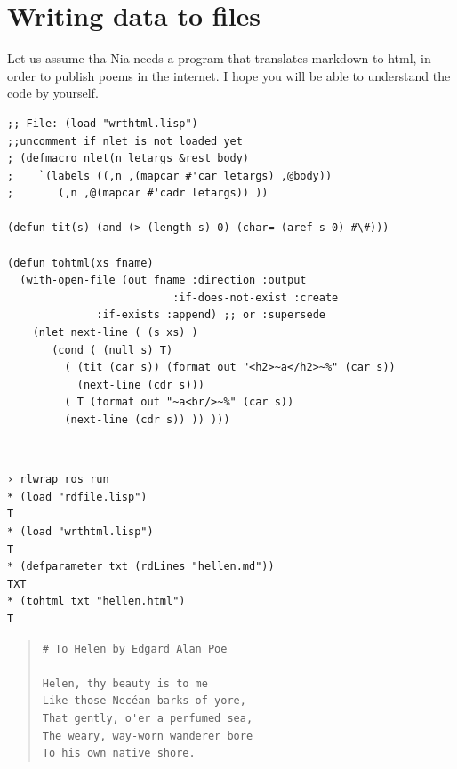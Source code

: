 \documentclass[a4paper,12pt]{book}
\newenvironment{fmpage}[1]
           {\begin{lrbox}{\fmbox}\begin{minipage}{#1}}
           {\end{minipage}\end{lrbox}\fbox{\usebox{\fmbox}}}
\begin{document}
\section{Writing data to files}
Let us assume tha Nia needs a program that translates
markdown to html, in order to publish poems in the internet.
I hope you will be able to understand the code by yourself.\\
\begin{fmpage}{\linewidth}
\begin{verbatim}
;; File: (load "wrthtml.lisp")
;;uncomment if nlet is not loaded yet
; (defmacro nlet(n letargs &rest body)
;    `(labels ((,n ,(mapcar #'car letargs) ,@body))
;       (,n ,@(mapcar #'cadr letargs)) ))

(defun tit(s) (and (> (length s) 0) (char= (aref s 0) #\#)))

(defun tohtml(xs fname)
  (with-open-file (out fname :direction :output
                          :if-does-not-exist :create
			  :if-exists :append) ;; or :supersede
    (nlet next-line ( (s xs) )
       (cond ( (null s) T)
	     ( (tit (car s)) (format out "<h2>~a</h2>~%" (car s))
	       (next-line (cdr s)))
	     ( T (format out "~a<br/>~%" (car s))
		 (next-line (cdr s)) )) )))
\end{verbatim}
\end{fmpage}
\verb||\\
\begin{fmpage}{\linewidth}
\begin{verbatim}
› rlwrap ros run
* (load "rdfile.lisp")
T
* (load "wrthtml.lisp")
T
* (defparameter txt (rdLines "hellen.md"))
TXT
* (tohtml txt "hellen.html")
T
\end{verbatim}
\end{fmpage}


\begin{quote}
\begin{verbatim}
# To Helen by Edgard Alan Poe

Helen, thy beauty is to me
Like those Necéan barks of yore,
That gently, o'er a perfumed sea,
The weary, way-worn wanderer bore
To his own native shore.
\end{verbatim}
\end{quote}

\end{document}
